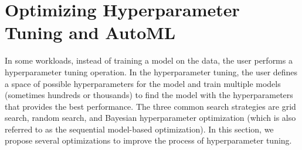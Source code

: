 \section{Optimizing Hyperparameter Tuning and AutoML} \label{sec-hyperparam-optimization}
In some workloads, instead of training a model on the data, the user performs a hyperparameter tuning operation.
In the hyperparameter tuning, the user defines a space of possible hyperparameters for the model and train multiple models (sometimes hundreds or thousands) to find the model with the hyperparameters that provides the best performance.
The three common search strategies are grid search, random search, and Bayesian hyperparameter optimization (which is also referred to as the sequential model-based optimization).
In this section, we propose several optimizations to improve the process of hyperparameter tuning.

